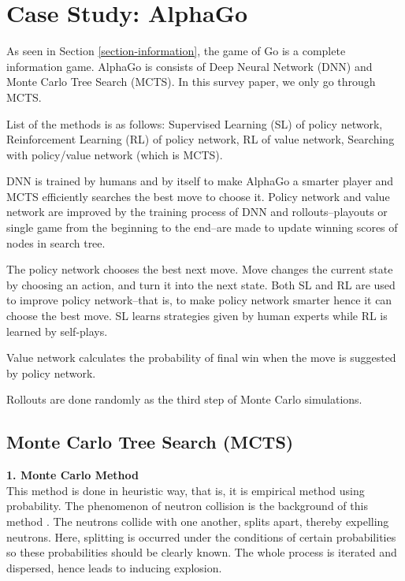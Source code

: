 \documentclass[11pt]{article}
\begin{document}
	\section{Case Study: AlphaGo}\label{section-alphago}
	As seen in Section \ref{section-information}, the game of Go is a complete information game. AlphaGo is consists of Deep Neural Network (DNN) and Monte Carlo Tree Search (MCTS). In this survey paper, we only go through MCTS.
	
	List of the methods is as follows: Supervised Learning (SL) of policy network, Reinforcement Learning (RL) of policy network, RL of value network, Searching with policy/value network (which is MCTS).
	
	DNN is trained by humans and by itself to make AlphaGo a smarter player and MCTS efficiently searches the best move to choose it. Policy network and value network are improved by the training process of DNN and rollouts--playouts or single game from the beginning to the end--are made to update winning scores of nodes in search tree.

	The policy network chooses the best next move. Move changes the current state by choosing an action, and turn it into the next state. Both SL and RL are used to improve policy network--that is, to make policy network smarter hence it can choose the best move. SL learns strategies given by human experts while RL is learned by self-plays.
	
	Value network calculates the probability of final win when the move is suggested by policy network.
	
	Rollouts are done randomly as the third step of Monte Carlo simulations.
	
	
	\subsection{Monte Carlo Tree Search (MCTS)}

	\textbf{1. Monte Carlo Method}\\	
	This method is done in heuristic way, that is, it is empirical method using probability. 
	The phenomenon of neutron collision is the background of this method%
	. The neutrons collide with one another, splits apart, thereby expelling neutrons. Here, splitting is occurred under the conditions of certain probabilities so these probabilities should be clearly known. The whole process is iterated and dispersed, hence leads to inducing explosion.
\end{document}
